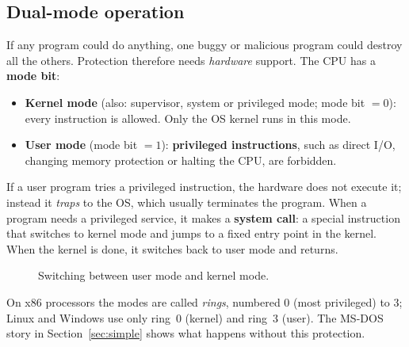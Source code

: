 \documentclass[11pt,a4paper]{article}
\newcommand{\term}[1]{\textbf{\color{mintdeep}#1}}
\begin{document}
\subsection{Dual-mode operation}
\label{sec:dualmode}

If any program could do anything, one buggy or malicious program could destroy all the others. Protection therefore needs \emph{hardware} support. The CPU has a \term{mode bit}:

\begin{itemize}
  \item \textbf{Kernel mode} (also: supervisor, system or privileged mode; mode bit $=0$): every instruction is allowed. Only the OS kernel runs in this mode.
  \item \textbf{User mode} (mode bit $=1$): \term{privileged instructions}, such as direct I/O, changing memory protection or halting the CPU, are forbidden.
\end{itemize}

If a user program tries a privileged instruction, the hardware does not execute it; instead it \emph{traps} to the OS, which usually terminates the program. When a program needs a privileged service, it makes a \term{system call}: a special instruction that switches to kernel mode and jumps to a fixed entry point in the kernel. When the kernel is done, it switches back to user mode and returns.

\begin{figure}[H]
\centering
{}
\caption{Switching between user mode and kernel mode.}
\end{figure}

On x86 processors the modes are called \emph{rings}, numbered $0$ (most privileged) to $3$; Linux and Windows use only ring~0 (kernel) and ring~3 (user). The MS-DOS story in Section~\ref{sec:simple} shows what happens without this protection.
\end{document}
